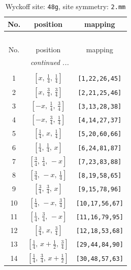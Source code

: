 \documentclass[fleqn,8pt]{jsarticle}
\begin{document}
\begin{longtable}{ccc}
\caption{Wyckoff site: {\tt 48g}, site symmetry: {\tt 2.mm}}
 \\
 \hline \hline
No. & position & mapping \\ \hline \endfirsthead

\multicolumn{2}{l}{\tablename\ \thetable{}} \\
 \hline \hline
No. & position & mapping \\ \hline \endhead

 \hline \hline
\multicolumn{2}{r}{\footnotesize\it continued ...} \\ \endfoot

 \hline \hline
\multicolumn{2}{r}{} \\ \endlastfoot

1 & $\left[ x,\, \frac{1}{4},\, \frac{1}{4} \right]$ & {\tt [1,22,26,45]} \\ \hline
2 & $\left[ x,\, \frac{3}{4},\, \frac{3}{4} \right]$ & {\tt [2,21,25,46]} \\ \hline
3 & $\left[ - x,\, \frac{1}{4},\, \frac{3}{4} \right]$ & {\tt [3,13,28,38]} \\ \hline
4 & $\left[ - x,\, \frac{3}{4},\, \frac{1}{4} \right]$ & {\tt [4,14,27,37]} \\ \hline
5 & $\left[ \frac{1}{4},\, x,\, \frac{1}{4} \right]$ & {\tt [5,20,60,66]} \\ \hline
6 & $\left[ \frac{1}{4},\, \frac{1}{4},\, x \right]$ & {\tt [6,24,81,87]} \\ \hline
7 & $\left[ \frac{3}{4},\, \frac{1}{4},\, - x \right]$ & {\tt [7,23,83,88]} \\ \hline
8 & $\left[ \frac{3}{4},\, - x,\, \frac{1}{4} \right]$ & {\tt [8,19,58,65]} \\ \hline
9 & $\left[ \frac{3}{4},\, \frac{3}{4},\, x \right]$ & {\tt [9,15,78,96]} \\ \hline
10 & $\left[ \frac{1}{4},\, - x,\, \frac{3}{4} \right]$ & {\tt [10,17,56,67]} \\ \hline
11 & $\left[ \frac{1}{4},\, \frac{3}{4},\, - x \right]$ & {\tt [11,16,79,95]} \\ \hline
12 & $\left[ \frac{3}{4},\, x,\, \frac{3}{4} \right]$ & {\tt [12,18,53,68]} \\ \hline
13 & $\left[ \frac{1}{4},\, x + \frac{1}{2},\, \frac{3}{4} \right]$ & {\tt [29,44,84,90]} \\ \hline
14 & $\left[ \frac{1}{4},\, \frac{3}{4},\, x + \frac{1}{2} \right]$ & {\tt [30,48,57,63]} \\ \hline

\end{longtable}
\end{document}
